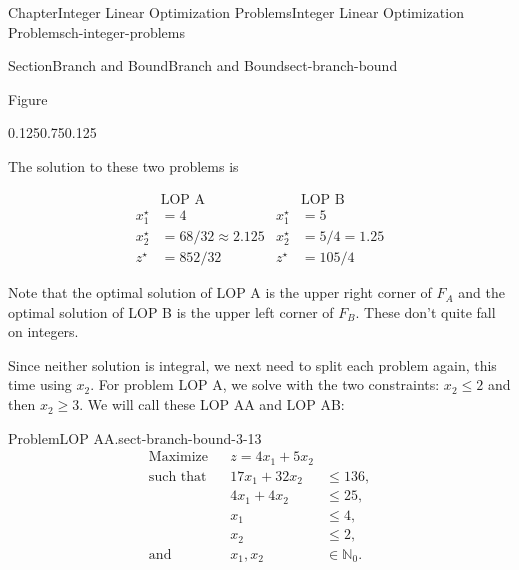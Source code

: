 \documentclass[oneside,10pt,]{book}
\numberwithin{equation}{section}
\newcommand{\amp}{&}
\begin{document}
\begin{chapterptx}{Chapter}{Integer Linear Optimization Problems}{}{Integer Linear Optimization Problems}{}{}{ch-integer-problems}
\begin{sectionptx}{Section}{Branch and Bound}{}{Branch and Bound}{}{}{sect-branch-bound}
\begin{introduction}{}
\begin{figureptx}{Figure}
\begin{image}{0.125}{0.75}{0.125}{}
{%
}%
\end{image}%
\tcblower
\end{figureptx}%
The solution to these two problems is%
\par
%
\begin{align*}
\amp \text{LOP A} \amp \amp \text{LOP B} \\
x_1^{\star} \amp = 4 \amp x_1^{\star} \amp = 5 \\
x_2^{\star} \amp = 68/32 \approx 2.125 \amp x_2^{\star} \amp = 5/4 = 1.25 \\
z^{\star} \amp = 852/32 \amp z^{\star} \amp = 105/4
\end{align*}
%
\par
Note that the optimal solution of LOP A is the upper right corner of \(F_A\) and the optimal solution of LOP B is the upper left corner of \(F_B\). These don't quite fall on integers.%
\par
Since neither solution is integral, we next need to split each problem again, this time using \(x_{2}\). For problem LOP A, we solve with the two constraints: \(x_{2} \leq 2\) and then \(x_{2} \geq 3\). We will call these LOP AA and LOP AB:%
\begin{problem}{Problem}{LOP AA.}{sect-branch-bound-3-13}%
%
\begin{equation*}
\begin{aligned} \text{Maximize} \amp\amp z = 4x_1 + 5x_2 \amp \\ \text{such that}\amp\amp 17x_1+32x_2 \amp\leq 136, \\ \amp\amp 4x_1 + 4x_2 \amp\leq 25, \\ \amp\amp x_1 \amp \leq 4, \\ \amp\amp x_2 \amp \leq 2, \\ \text{and}\amp\amp x_1, x_2 \amp \in \mathbb{N}_0.

\end{aligned}
\end{equation*}
\end{problem}
\end{introduction}
\end{sectionptx}
\end{chapterptx}
\end{document}
